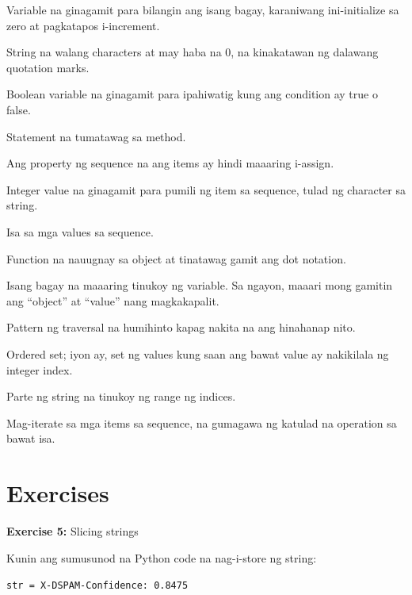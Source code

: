 \documentclass[10pt,]{book}
\providecommand{\tightlist}{%
  \setlength{\itemsep}{0pt}\setlength{\parskip}{0pt}}
\begin{document}
\begin{description}
\tightlist
\item[counter]
Variable na ginagamit para bilangin ang isang bagay, karaniwang
ini-initialize sa zero at pagkatapos i-increment. 
\item[empty string]
String na walang characters at may haba na 0, na kinakatawan ng dalawang
quotation marks. 
\item[flag]
Boolean variable na ginagamit para ipahiwatig kung ang condition ay true
o false. 
\item[invocation]
Statement na tumatawag sa method. 
\item[immutable]
Ang property ng sequence na ang items ay hindi maaaring i-assign.
\item[index]
Integer value na ginagamit para pumili ng item sa sequence, tulad ng
character sa string.  \index{}
\item[item]
Isa sa mga values sa sequence. 
\item[method]
Function na nauugnay sa object at tinatawag gamit ang dot notation.
\item[object]
Isang bagay na maaaring tinukoy ng variable. Sa ngayon, maaari mong
gamitin ang ``object'' at ``value'' nang magkakapalit. 
\item[search]
Pattern ng traversal na humihinto kapag nakita na ang hinahanap nito.
 
\item[sequence]
Ordered set; iyon ay, set ng values kung saan ang bawat value ay
nakikilala ng integer index. 
\item[slice]
Parte ng string na tinukoy ng range ng indices. 
\item[traverse]
Mag-iterate sa mga items sa sequence, na gumagawa ng katulad na
operation sa bawat isa. 
\end{description}

\section{Exercises}\label{exercises-5}

\textbf{Exercise 5:} Slicing strings

Kunin ang sumusunod na Python code na nag-i-store ng string:

\texttt{str\ =\ \textquotesingle{}X-DSPAM-Confidence:\ 0.8475\textquotesingle{}}
\end{document}
